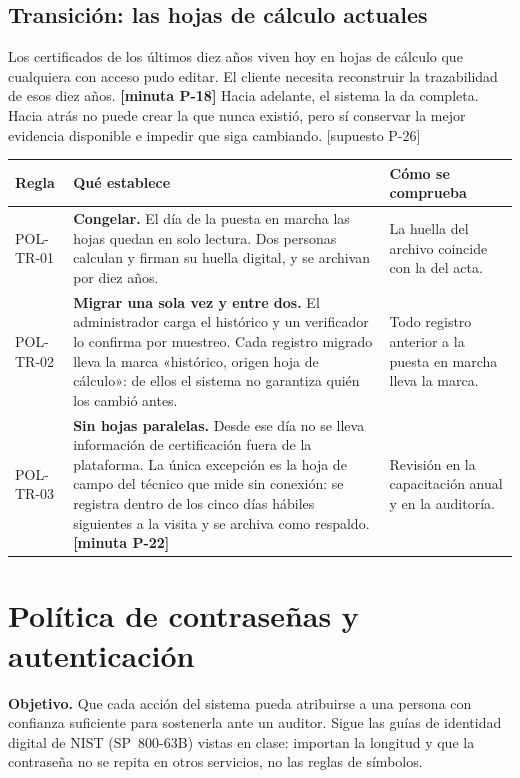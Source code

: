 \documentclass[11pt,letterpaper]{article}
\newcommand{\cab}[1]{\textbf{\rmfamily #1}}
\newcommand{\resp}[1]{\textrm{\footnotesize\bfseries [minuta #1]}}
\newcommand{\supu}[1]{\textrm{\footnotesize [supuesto #1]}}
\begin{document}
\subsection{Transición: las hojas de cálculo actuales}

Los certificados de los últimos diez años viven hoy en hojas de cálculo que cualquiera con acceso pudo
editar. El cliente necesita reconstruir la trazabilidad de esos diez años. \resp{P-18} Hacia adelante,
el sistema la da completa. Hacia atrás no puede crear la que nunca existió, pero sí conservar la mejor
evidencia disponible e impedir que siga cambiando. \supu{P-26}

{\small
\renewcommand{\arraystretch}{1.14}
\begin{longtable}{@{}L{1.7cm} L{9.2cm} L{4.8cm}@{}}
\toprule
\cab{Regla} & \cab{Qué establece} & \cab{Cómo se comprueba} \\
\midrule
\endfirsthead
\bottomrule
\endfoot
POL-TR-01 & \textbf{Congelar.} El día de la puesta en marcha las hojas quedan en solo lectura. Dos personas calculan y firman su huella digital, y se archivan por diez años. & La huella del archivo coincide con la del acta. \\
POL-TR-02 & \textbf{Migrar una sola vez y entre dos.} El administrador carga el histórico y un verificador lo confirma por muestreo. Cada registro migrado lleva la marca «histórico, origen hoja de cálculo»: de ellos el sistema no garantiza quién los cambió antes. & Todo registro anterior a la puesta en marcha lleva la marca. \\
POL-TR-03 & \textbf{Sin hojas paralelas.} Desde ese día no se lleva información de certificación fuera de la plataforma. La única excepción es la hoja de campo del técnico que mide sin conexión: se registra dentro de los cinco días hábiles siguientes a la visita y se archiva como respaldo. \resp{P-22} & Revisión en la capacitación anual y en la auditoría. \\
\end{longtable}
}

\section{Política de contraseñas y autenticación}
\label{sec:autenticacion}

\textbf{Objetivo.} Que cada acción del sistema pueda atribuirse a una persona con confianza suficiente
para sostenerla ante un auditor. Sigue las guías de identidad digital de NIST (SP~800-63B) vistas en
clase: importan la longitud y que la contraseña no se repita en otros servicios, no las reglas de
símbolos.
\end{document}
